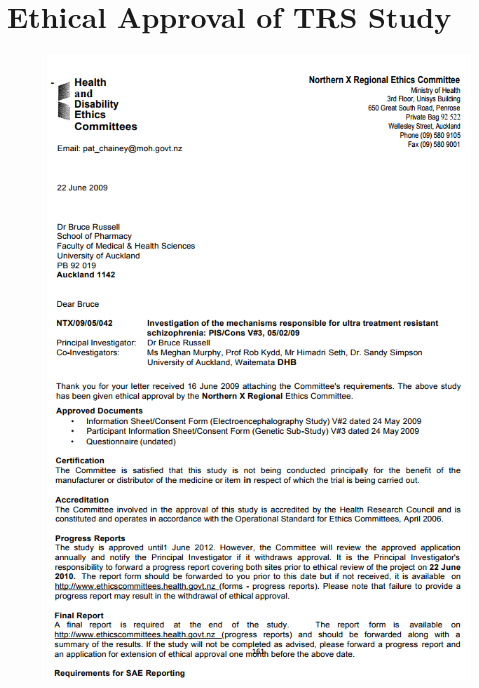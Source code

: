 
\chapter{Ethical Approval of TRS Study}
\label{app:ethical_approval}

\begin{figure}
	\centering
	\includegraphics[width=\linewidth]{fig/ethicalapproval/approval1.PNG}
\end{figure}
